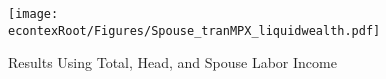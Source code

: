 \documentclass[titlepage]{\econtex}\newcommand{\texname}{ConsumptionHeterogeneity}
\begin{document}
	
	\begin{figure} 
		\begin{centering}
			\texttt{[image: \\econtexRoot/Figures/Spouse\_tranMPX\_liquidwealth.pdf]}
			\caption{Results Using Total, Head, and Spouse Labor Income}
			\label{fig:Robust_Spouse}
		\end{centering}
	\end{figure}
	
	
	
	
\end{document}
